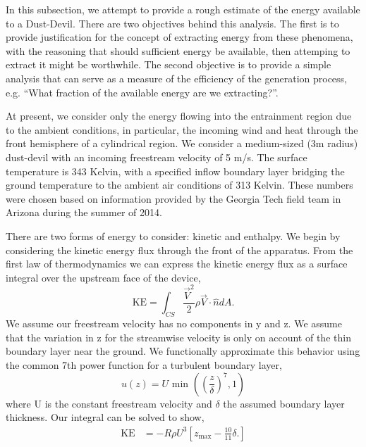 In this subsection, we attempt to provide a rough estimate of the energy
available to a Dust-Devil. There are two objectives behind this
analysis. The first is to provide justification for the concept of
extracting energy from these phenomena, with the reasoning that should
sufficient energy be available, then attemping to extract it might be
worthwhile. The second objective is to provide a simple analysis that
can serve as a measure of the efficiency of the generation process,
e.g. ``What fraction of the available energy are we extracting?''.  

At present, we consider only the energy flowing into the entrainment
region due to the ambient conditions, in particular, the incoming wind
and heat through the front hemisphere of a cylindrical region. We
consider a medium-sized (3m radius) dust-devil with an incoming
freestream velocity of 5 m/s. The surface temperature is 343 Kelvin,
with a specified inflow boundary layer bridging the ground temperature
to the ambient air conditions of 313 Kelvin. 
These numbers were chosen
based on information provided by the Georgia Tech field team in Arizona
during the summer of 2014.  

There are two forms of energy to consider: kinetic and enthalpy. We
begin by considering the kinetic energy flux through the front of the
apparatus. From the first law of thermodynamics we can express the
kinetic energy flux as a surface integral over the upstream face of the device, 
\begin{equation*}
\text{KE} = \int_{CS} \frac{\vec V^2}{2} \rho \vec V \cdot \hat n dA.
\end{equation*}
%
%
We assume our freestream velocity has no components in y and z.
We assume that the variation in z for the streamwise velocity is only on
account of the thin boundary layer near the ground. We functionally
approximate this behavior using the common 7th power function for a
turbulent boundary layer,  
\begin{equation*}
  u(z) = U \text{ min }\left(\left(\frac{z}{\delta}\right)^7,1\right)
\end{equation*}
where U is the constant freestream velocity and $\delta$ the assumed
boundary layer thickness. Our integral can be solved to show, 
\begin{align*}
\text{KE} & = -R \rho U^3 \left[ z_{\text{max}} - \frac{10}{11}\delta.
\right]
\end{align*}


